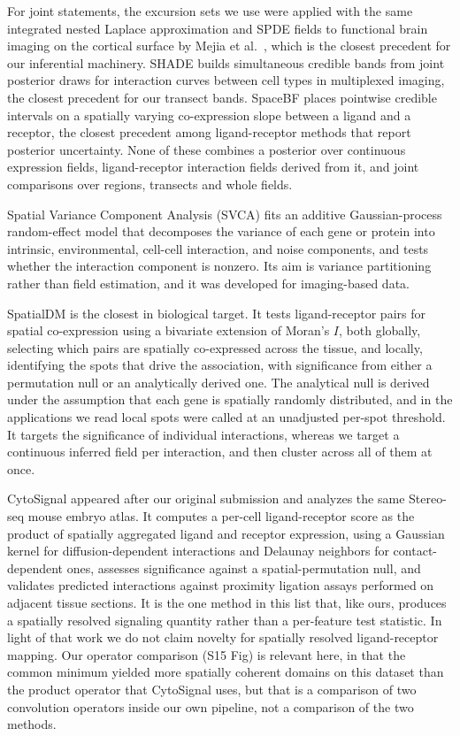 \documentclass[10pt,letterpaper]{article}
\begin{document}
For joint statements, the excursion sets we use \cite{bolin2015excursion,bolin2018excursions} were applied with the same integrated nested Laplace approximation and SPDE fields to functional brain imaging on the cortical surface by Mejia et al.\ \cite{mejia2020bayesian}, which is the closest precedent for our inferential machinery. SHADE \cite{eliason2026shade} builds simultaneous credible bands from joint posterior draws for interaction curves between cell types in multiplexed imaging, the closest precedent for our transect bands. SpaceBF \cite{seal2026spacebf} places pointwise credible intervals on a spatially varying co-expression slope between a ligand and a receptor, the closest precedent among ligand-receptor methods that report posterior uncertainty. None of these combines a posterior over continuous expression fields, ligand-receptor interaction fields derived from it, and joint comparisons over regions, transects and whole fields.

Spatial Variance Component Analysis (SVCA) \cite{Arnol2019} fits an additive Gaussian-process random-effect model that decomposes the variance of each gene or protein into intrinsic, environmental, cell-cell interaction, and noise components, and tests whether the interaction component is nonzero. Its aim is variance partitioning rather than field estimation, and it was developed for imaging-based data.

SpatialDM \cite{Li2023} is the closest in biological target. It tests ligand-receptor pairs for spatial co-expression using a bivariate extension of Moran's $I$, both globally, selecting which pairs are spatially co-expressed across the tissue, and locally, identifying the spots that drive the association, with significance from either a permutation null or an analytically derived one. The analytical null is derived under the assumption that each gene is spatially randomly distributed, and in the applications we read local spots were called at an unadjusted per-spot threshold. It targets the significance of individual interactions, whereas we target a continuous inferred field per interaction, and then cluster across all of them at once.

CytoSignal \cite{Liu2026} appeared after our original submission and analyzes the same Stereo-seq mouse embryo atlas. It computes a per-cell ligand-receptor score as the product of spatially aggregated ligand and receptor expression, using a Gaussian kernel for diffusion-dependent interactions and Delaunay neighbors for contact-dependent ones, assesses significance against a spatial-permutation null, and validates predicted interactions against proximity ligation assays performed on adjacent tissue sections. It is the one method in this list that, like ours, produces a spatially resolved signaling quantity rather than a per-feature test statistic. In light of that work we do not claim novelty for spatially resolved ligand-receptor mapping. Our operator comparison (S15 Fig) is relevant here, in that the common minimum yielded more spatially coherent domains on this dataset than the product operator that CytoSignal uses, but that is a comparison of two convolution operators inside our own pipeline, not a comparison of the two methods.
\end{document}
